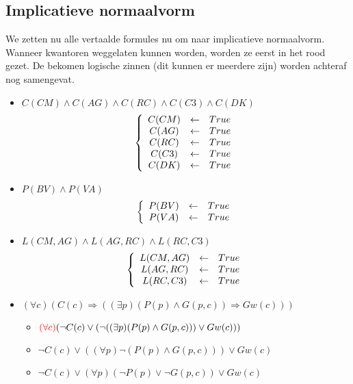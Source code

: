 \documentclass[alternative-exam.tex]{subfiles}
\begin{document}
\subsection{Implicatieve normaalvorm}
We zetten nu alle vertaalde formules nu om naar implicatieve normaalvorm.
Wanneer kwantoren weggelaten kunnen worden, worden ze eerst in het rood gezet. De bekomen logische zinnen (dit kunnen er meerdere zijn) worden achteraf nog samengevat.
\begin{itemize}
\item $C(CM)\wedge C(AG)\wedge C(RC)\wedge C(C3)\wedge C(DK)$
\[
\left\{
\begin{array}{c c c}
C(CM) &\leftarrow& True\\
C(AG) &\leftarrow& True\\
C(RC) &\leftarrow& True\\
C(C3) &\leftarrow& True\\
C(DK) &\leftarrow& True\\
\end{array}
\right.
\]

\item $P(BV) \wedge P(VA)$
\[
\left\{
\begin{array}{c c c}
P(BV) &\leftarrow& True\\
P(VA) &\leftarrow& True\\
\end{array}
\right.
\]

\item $L(CM,AG) \wedge L(AG,RC) \wedge L(RC,C3)$
\[
\left\{
\begin{array}{c c c}
L(CM,AG) &\leftarrow& True\\
L(AG,RC) &\leftarrow& True\\
L(RC,C3) &\leftarrow& True\\
\end{array}
\right.
\]

\item $(\forall c)(C(c) \Rightarrow ((\exists p) (P(p) \wedge G(p,c)) \Rightarrow Gw(c)))$
\begin{itemize}
\item $ {\color{red}(\forall c)} (\neg C(c) \vee (\neg ((\exists p)(P(p)\wedge G(p,c))) \vee Gw(c)))$

\item $\neg C(c) \vee ((\forall p)\neg(P(p)\wedge G(p,c))) \vee Gw(c)$

\item $\neg C(c) \vee (\forall p)(\neg P(p)\vee \neg G(p,c)) \vee Gw(c)$


\end{itemize}
\end{itemize}
\end{document}

